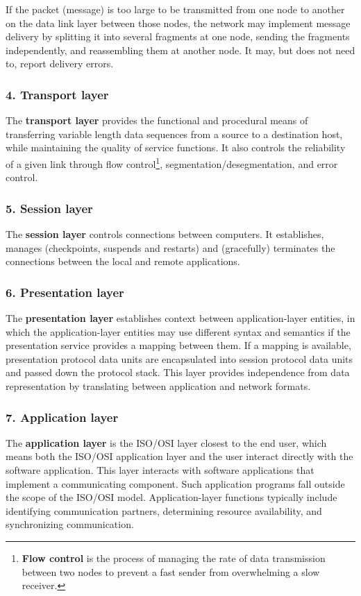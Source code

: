 If the packet (message) is too large to be transmitted from one node to another on the data link layer between those nodes, the network may implement message delivery by splitting it into several fragments at one node, sending the fragments independently, and reassembling them at another node. It may, but does not need to, report delivery errors.


\subsubsection*{4. Transport layer}
The \textbf{transport layer} provides the functional and procedural means of transferring variable length data sequences from a source to a destination host, while maintaining the quality of service functions. It also controls the reliability of a given link through flow control\footnote{\textbf{Flow control} is the process of managing the rate of data transmission between two nodes to prevent a fast sender from overwhelming a slow receiver.}, segmentation/desegmentation, and error control. 


\subsubsection*{5. Session layer}
The \textbf{session layer} controls connections between computers. It establishes, manages (checkpoints, suspends and restarts) and (gracefully) terminates the connections between the local and remote applications.


\subsubsection*{6. Presentation layer}
The \textbf{presentation layer} establishes context between application-layer entities, in which the application-layer entities may use different syntax and semantics if the presentation service provides a mapping between them. If a mapping is available, presentation protocol data units are encapsulated into session protocol data units and passed down the protocol stack. This layer provides independence from data representation by translating between application and network formats. 


\subsubsection*{7. Application layer}
The \textbf{application layer} is the ISO/OSI layer closest to the end user, which means both the ISO/OSI application layer and the user interact directly with the software application. This layer interacts with software applications that implement a communicating component. Such application programs fall outside the scope of the ISO/OSI model. Application-layer functions typically include identifying communication partners, determining resource availability, and synchronizing communication.

